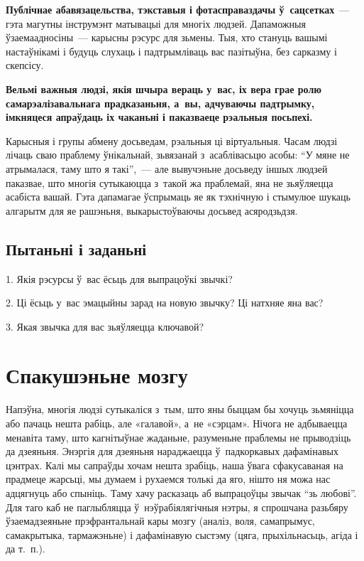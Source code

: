 \textbf{Публічнае абавязацельства, тэкставыя і фотасправаздачы ў~сацсетках}~--- гэта магутны інструмэнт матывацыі для многіх людзей. Дапаможныя ўзаемаадносіны~--- карысны рэсурс для зьмены. Тыя, хто стануць вашымі настаўнікамі і будуць слухаць і падтрымліваць вас пазітыўна, без сарказму і скепсісу.

\textbf{Вельмі важныя людзі, якія шчыра вераць у~вас, іх вера грае ролю самарэалізавальнага прадказаньня, а~вы, адчуваючы падтрымку, імкняцеся апраўдаць іх чаканьні і паказваеце рэальныя посьпехі.}

Карысныя і групы абмену досьведам, рэальныя ці віртуальныя. Часам людзі лічаць сваю праблему ўнікальнай, зьвязанай з~асаблівасьцю асобы: ``У мяне не атрымалася, таму што я такі'',~--- але вывучэньне досьведу іншых людзей паказвае, што многія сутыкаюцца з~такой жа праблемай, яна не зьяўляецца асабіста вашай. Гэта дапамагае ўспрымаць яе як тэхнічную і стымулюе шукаць алгарытм для яе рашэньня, выкарыстоўваючы досьвед асяродзьдзя.

\subsection*{Пытаньні і заданьні}

1. Якія рэсурсы ў~вас ёсьць для выпрацоўкі звычкі?

2. Ці ёсьць у~вас эмацыйны зарад на новую звычку? Ці натхняе яна вас?

3. Якая звычка для вас зьяўляецца ключавой?


\section{Спакушэньне мозгу}

Напэўна, многія людзі сутыкаліся з~тым, што яны быццам бы хочуць зьмяніцца або пачаць нешта рабіць, але «галавой», а~не «сэрцам». Нічога не адбываецца менавіта таму, што кагнітыўнае жаданьне, разуменьне праблемы не прыводзіць да дзеяньня. Энэргія для дзеяньня нараджаецца ў~падкоркавых дафамінавых цэнтрах. Калі мы сапраўды хочам нешта зрабіць, наша ўвага сфакусаваная на прадмеце жарсьці, мы думаем і рухаемся толькі да яго, нішто ня можа нас адцягнуць або спыніць. Таму хачу расказаць аб выпрацоўцы звычак ``зь любові''. Для таго каб не паглыбляцца ў~нэўрабіялягічныя нэтры, я спрошчана разьбяру ўзаемадзеяньне прэфрантальнай кары мозгу (аналіз, воля, самапрымус, самакрытыка, тармажэньне) і дафамінавую сыстэму (цяга, прыхільнасьць, агіда і да т.~п.).

